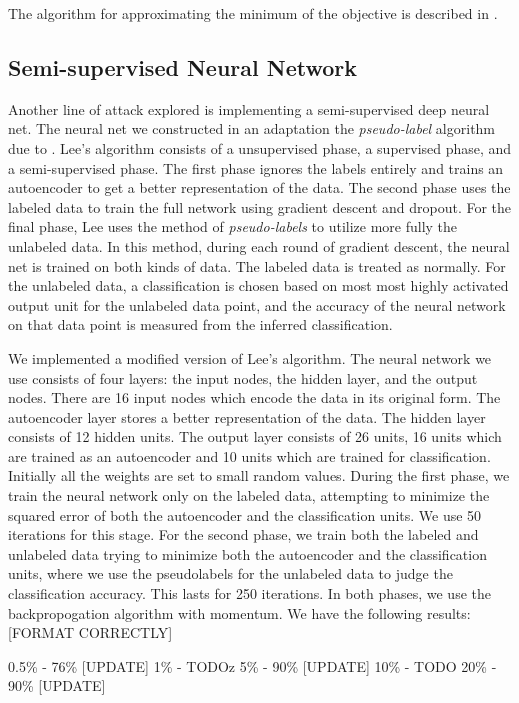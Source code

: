\documentclass[11pt]{article}
\begin{document}
The algorithm for approximating the minimum of the objective is described
in \cite{joachims2003transductive}.

\subsection{Semi-supervised Neural Network}

Another line of attack explored is implementing a semi-supervised deep neural net. The neural net we constructed in an adaptation the \emph{pseudo-label} algorithm due to \cite{Lee:2013}. Lee's algorithm consists of a unsupervised phase, a supervised phase, and a semi-supervised phase. The first phase ignores the labels entirely and trains an autoencoder to get a better representation of the data. The second phase uses the labeled data to train the full network using gradient descent and dropout. For the final phase, Lee uses the method of \emph{pseudo-labels} to utilize more fully the unlabeled data. In this method, during each round of gradient descent, the neural net is trained on both kinds of data. The labeled data is treated as normally. For the unlabeled data, a classification is chosen based on most most highly activated output unit for the unlabeled data point, and the accuracy of the neural network on that data point is measured from the inferred classification.

We implemented a modified version of Lee's algorithm. The neural network we use consists of four layers: the input nodes, the hidden layer, and the output nodes. There are 16 input nodes which encode the data in its original form. The autoencoder layer stores a better representation of the data. The hidden layer consists of 12 hidden units. The output layer consists of 26 units, 16 units which are trained as an autoencoder and 10 units which are trained for classification. Initially all the weights are set to small random values. During the first phase, we train the neural network only on the labeled data, attempting to minimize the squared error of both the autoencoder and the classification units. We use 50 iterations for this stage. For the second phase, we train both the labeled and unlabeled data trying to minimize both the autoencoder and the classification units, where we use the pseudolabels for the unlabeled data to judge the classification accuracy. This lasts for 250 iterations. In both phases, we use the backpropogation algorithm with momentum. We have the following results: [FORMAT CORRECTLY]

0.5\% - 76\% [UPDATE]
1\% - TODOz
5\% - 90\% [UPDATE]
10\% - TODO
20\% - 90\% [UPDATE]
\end{document}
